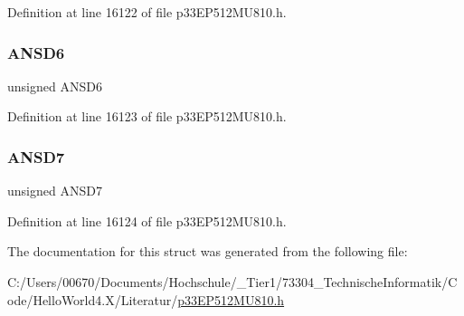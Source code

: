 Definition at line 16122 of file p33\+E\+P512\+M\+U810.\+h.

\mbox{\label{structtag_a_n_s_e_l_d_b_i_t_s_a29bb776bcfd6f982962d48de50986d8e}} 
\subsubsection{\texorpdfstring{A\+N\+S\+D6}{ANSD6}}
{\footnotesize\ttfamily unsigned A\+N\+S\+D6}



Definition at line 16123 of file p33\+E\+P512\+M\+U810.\+h.

\mbox{\label{structtag_a_n_s_e_l_d_b_i_t_s_a9962243f2338e3933bad1c7e68a5754b}} 
\subsubsection{\texorpdfstring{A\+N\+S\+D7}{ANSD7}}
{\footnotesize\ttfamily unsigned A\+N\+S\+D7}



Definition at line 16124 of file p33\+E\+P512\+M\+U810.\+h.



The documentation for this struct was generated from the following file\+:\begin{DoxyCompactItemize}
\item 
C\+:/\+Users/00670/\+Documents/\+Hochschule/\+\_\+\+Tier1/73304\+\_\+\+Technische\+Informatik/\+Code/\+Hello\+World4.\+X/\+Literatur/\hyperlink{p33_e_p512_m_u810_8h}{p33\+E\+P512\+M\+U810.\+h}\end{DoxyCompactItemize}
